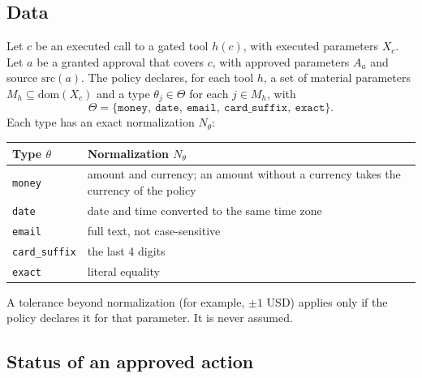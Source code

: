 \documentclass[11pt,a4paper]{article}
\begin{document}
\subsection{Data}

Let $c$ be an executed call to a gated tool $h(c)$, with executed parameters $X_c$. Let $a$ be a granted approval
that covers $c$, with approved parameters $A_a$ and source $\mathrm{src}(a)$. The policy declares, for each tool
$h$, a set of material parameters $M_h \subseteq \mathrm{dom}(X_c)$ and a type $\theta_j \in \Theta$ for each
$j \in M_h$, with
\begin{equation}
  \Theta = \{\texttt{money},\ \texttt{date},\ \texttt{email},\ \texttt{card\_suffix},\ \texttt{exact}\}.
\end{equation}
Each type has an exact normalization $N_\theta$:

\begin{center}
\begin{tabular}{@{}lp{11cm}@{}}
\toprule
Type $\theta$ & Normalization $N_\theta$ \\
\midrule
\texttt{money} & amount and currency; an amount without a currency takes the currency of the policy \\
\texttt{date} & date and time converted to the same time zone \\
\texttt{email} & full text, not case-sensitive \\
\texttt{card\_suffix} & the last 4 digits \\
\texttt{exact} & literal equality \\
\bottomrule
\end{tabular}
\end{center}

A tolerance beyond normalization (for example, $\pm 1$ USD) applies only if the policy declares it for that
parameter. It is never assumed.

\subsection{Status of an approved action}
\end{document}
